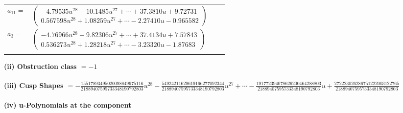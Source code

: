 \documentclass[1p]{elsarticle_modified}
\theoremstyle{definition}
\begin{document}
\begin{tabular}{m{7pt} m{180pt} m{7pt} m{180pt} }
\flushright $a_{11}=$&$\begin{pmatrix}-4.79535 u^{28}-10.1485 u^{27}+\cdots+37.3810 u+9.72731\\0.567598 u^{28}+1.08259 u^{27}+\cdots-2.27410 u-0.965582\end{pmatrix}$ \\
\flushright $a_{3}=$&$\begin{pmatrix}-4.76966 u^{28}-9.82306 u^{27}+\cdots+37.4134 u+7.57843\\0.536273 u^{28}+1.28218 u^{27}+\cdots-3.23320 u-1.87683\end{pmatrix}$\\&\end{tabular}
\flushleft \textbf{(ii) Obstruction class $= -1$}\\~\\
\flushleft \textbf{(iii) Cusp Shapes $= -\frac{15517893495020098849975116}{21889407595733348190792803} u^{28}-\frac{54924211629619166277092344}{21889407595733348190792803} u^{27}+\cdots-\frac{191772394078626200464288803}{21889407595733348190792803} u+\frac{272223026286751222003122765}{21889407595733348190792803}$}\\~\\
\newpage\renewcommand{\arraystretch}{1}
\flushleft \textbf{(iv) u-Polynomials at the component}\newline \\
\end{document}
